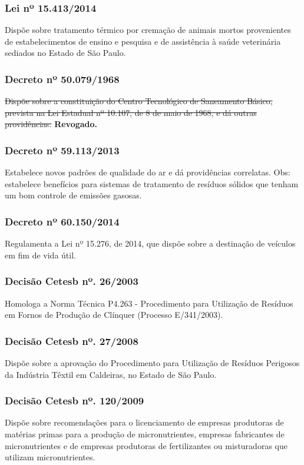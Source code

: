 \begin{subapend}
\begin{subsubapend}
		\subsubsection{Lei nº 15.413/2014}
		Dispõe sobre tratamento térmico por cremação de animais mortos provenientes de estabelecimentos de ensino e pesquisa e de assistência à saúde veterinária sediados no Estado de São Paulo.
		\subsubsection{Decreto nº 50.079/1968}
		\sout{Dispõe sobre a constituição do Centro Tecnológico de Saneamento Básico, prevista na Lei Estadual nº 10.107, de 8 de maio de 1968, e dá outras providências.} \textbf{Revogado.}
		\subsubsection{Decreto nº 59.113/2013}
		Estabelece novos padrões de qualidade do ar e dá providências correlatas. Obs: estabelece benefícios para sistemas de tratamento de resíduos sólidos que tenham um bom controle de emissões gasosas.
		\subsubsection{Decreto nº 60.150/2014}
		Regulamenta a Lei nº 15.276, de 2014, que dispõe sobre a destinação de veículos em fim de vida útil.
		\subsubsection{Decisão Cetesb nº. 26/2003}
		Homologa a Norma Técnica P4.263 - Procedimento para Utilização de Resíduos em Fornos de Produção de Clínquer (Processo E/341/2003).
		\subsubsection{Decisão Cetesb nº. 27/2008}
		Dispõe sobre a aprovação do Procedimento para Utilização de Resíduos Perigosos da Indústria Têxtil em Caldeiras, no Estado de São Paulo.
		\subsubsection{Decisão Cetesb nº. 120/2009}
		Dispõe sobre recomendações para o licenciamento de empresas produtoras de matérias primas para a produção de micronutrientes, empresas fabricantes de micronutrientes e de empresas produtoras de fertilizantes ou misturadoras que utilizam micronutrientes.

\end{subsubapend}
\end{subapend}
